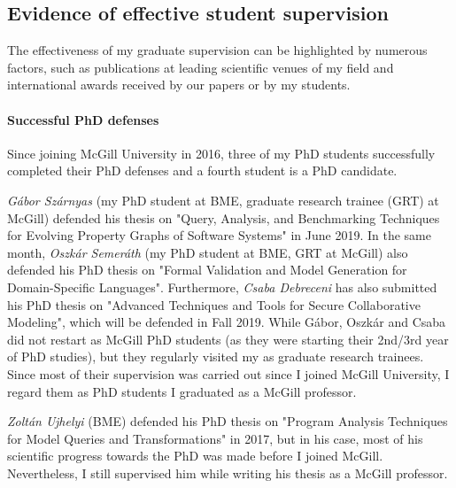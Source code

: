 \subsection{Evidence of effective student supervision}
\label{sec:evid-student-super}

The effectiveness of my graduate supervision can be highlighted by numerous factors, such as publications at leading scientific venues of my field and international awards received by our papers or by my students. 


\paragraph{Successful PhD defenses}
Since joining McGill University in 2016, three of my PhD students successfully completed their PhD defenses and a fourth student is a PhD candidate. 

\emph{Gábor Szárnyas} (my PhD student at BME, graduate research trainee (GRT) at McGill) defended his thesis on "Query, Analysis, and Benchmarking Techniques for Evolving Property Graphs of Software Systems" in June 2019. In the same month, \emph{Oszkár Semeráth} (my PhD student at BME, GRT at McGill) also defended his PhD thesis on "Formal Validation and Model Generation for Domain-Specific Languages". Furthermore, \emph{Csaba Debreceni} has also submitted his PhD thesis on "Advanced Techniques and Tools for Secure Collaborative Modeling", which will be defended in Fall 2019. 
While Gábor, Oszkár and Csaba did not restart as McGill PhD students (as they were starting their 2nd/3rd year of PhD studies), but they regularly visited my as graduate research trainees. Since most of their supervision was carried out since I joined McGill University, I regard them as PhD students I graduated as a McGill professor. 

\emph{Zoltán Ujhelyi} (BME) defended his PhD thesis on "Program Analysis Techniques for Model Queries and Transformations" in 2017, but in his case, most of his scientific progress towards the PhD was made before I joined McGill. Nevertheless, I still supervised him while writing his thesis as a McGill professor.  

